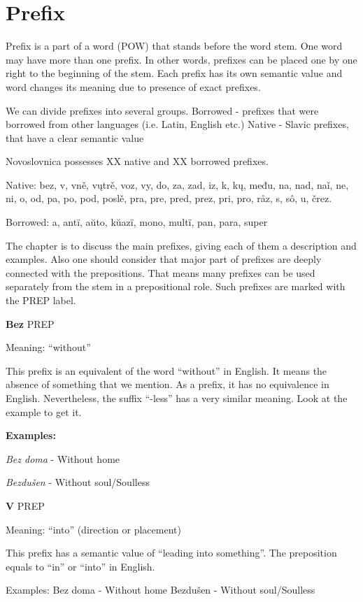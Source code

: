\section{Prefix}

Prefix is a part of a word (POW) that stands before the word stem. One word may have more than one prefix. In other words, prefixes can be placed one by one right to the beginning of the stem. Each prefix has its own semantic value and word changes its meaning due to presence of exact prefixes.

We can divide prefixes into several groups. 
Borrowed - prefixes that were borrowed from other languages (i.e. Latin, English etc.)
Native - Slavic prefixes, that have a clear semantic value

Novoslovnica possesses XX native and XX borrowed prefixes.

Native: bez, v, vně, vųtrě, voz, vy, do, za, zad, iz, k, kų, među, na, nad, naǐ, ne, ni, o, od, pa, po, pod, poslě, pra, pre, pred, prez, pri, pro, råz, s, sô, u, črez.

Borrowed: a, antï, aŭto, kŭazï, mono, multï, pan, para, super

The chapter is to discuss the main prefixes, giving each of them a description and examples. Also one should consider that major part of prefixes are deeply connected with the prepositions. That means many prefixes can be used separately from the stem in a prepositional role. Such prefixes are marked with the PREP label. 

\textbf{Bez} PREP

Meaning: “without”

This prefix is an equivalent of the word “without” in English. It means the absence of something that we mention. As a prefix, it has no equivalence in English. Nevertheless, the suffix “-less” has a very similar meaning. Look at the example to get it.

\textbf{Examples:}

\textit{Bez doma} - Without home

\textit{Bezdušen} - Without soul/Soulless 


\textbf{V} PREP

Meaning: “into” (direction or placement)

This prefix has a semantic value of “leading into something”. The preposition equals to “in” or “into” in English.

Examples:
Bez doma - Without home
Bezdušen - Without soul/Soulless 


